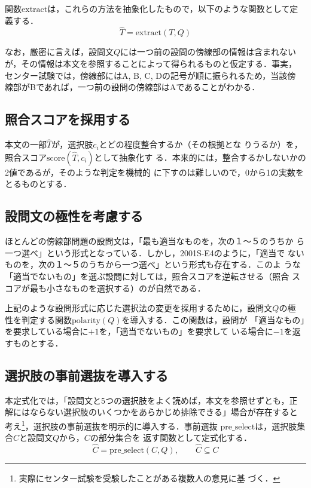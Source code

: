 \documentclass[japanese]{jnlp_1.4}
\begin{document}
関数$\mathrm{extract}$は，これらの方法を抽象化したもので，以下のような関数として定義する．
\begin{equation}
\widehat{T} = \mathrm{extract}(T, Q)
\end{equation}

なお，厳密に言えば，設問文$Q$には一つ前の設問の傍線部の情報は含まれない
が，その情報は本文を参照することによって得られるものと仮定する．事実，
センター試験では，傍線部にはA, B, C, Dの記号が順に振られるため，当該傍
線部がBであれば，一つ前の設問の傍線部はAであることがわかる．


\subsection{照合スコアを採用する}

本文の一部$\widehat{T}$が，選択肢$c_i$とどの程度整合するか（その根拠とな
りうるか）を，照合スコア$\mathrm{score}(\widehat{T}, c_i)$として抽象化す
る．本来的には，整合するかしないかの2値であるが，そのような判定を機械的
に下すのは難しいので，0から1の実数をとるものとする．


\subsection{設問文の極性を考慮する}

ほとんどの傍線部問題の設問文は，「最も適当なものを，次の１〜５のうちか
ら一つ選べ」という形式となっている．しかし，2001S-E4のように，「適当で
ないものを，次の１〜５のうちから一つ選べ」という形式も存在する．このよ
うな「適当でないもの」を選ぶ設問に対しては，照合スコアを逆転させる（照合
スコアが最も小さなものを選択する）のが自然である．

上記のような設問形式に応じた選択法の変更を採用するために，設問文$Q$の極
性を判定する関数$\mathrm{polarity}(Q)$を導入する．この関数は，設問が
「適当なもの」を要求している場合に$+1$を，「適当でないもの」を要求して
いる場合に$-1$を返すものとする．


\subsection{選択肢の事前選抜を導入する}

本定式化では，「設問文と5つの選択肢をよく読めば，本文を参照せずとも，正
解にはならない選択肢のいくつかをあらかじめ排除できる」場合が存在すると
考え\footnote{実際にセンター試験を受験したことがある複数人の意見に基
づく．}，選択肢の事前選抜を明示的に導入する．事前選抜
$\mathrm{pre\_select}$は，選択肢集合$C$と設問文$Q$から，$C$の部分集合を
返す関数として定式化する．
\begin{equation}
\widehat{C} = \mathrm{pre\_select}(C, Q), \qquad \widehat{C} \subseteq C
\end{equation}
\end{document}
